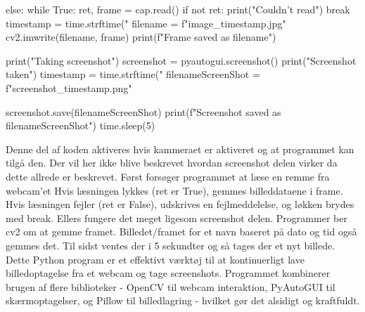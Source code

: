 \begin{python}
    else:
        while True:
            ret, frame = cap.read()
            if not ret:
                print("Couldn't read")
                break
            timestamp = time.strftime("%
            filename = f"image_{timestamp}.jpg"
            cv2.imwrite(filename, frame)
            print(f"Frame saved as {filename}")

            print("Taking screenshot")
            screenshot = pyautogui.screenshot()
            print("Screenshot taken")
            timestamp = time.strftime("%
            filenameScreenShot = f"screenshot_{timestamp}.png"

            screenshot.save(filenameScreenShot)
            print(f"Screenshot saved as {filenameScreenShot}")
            time.sleep(5)
\end{python}
Denne del af koden aktiveres hvis kammeraet er aktiveret og at programmet kan tilgå den. Der vil her ikke blive beskrevet hvordan screenshot delen virker da dette allrede er beskrevet. Først forsøger programmet at læse en remme fra webcam'et  Hvis læsningen lykkes (ret er True), gemmes billeddataene i frame. Hvis læsningen fejler (ret er False), udskrives en fejlmeddelelse, og løkken brydes med break. Ellers fungere det meget ligesom screenshot delen. Programmer ber cv2 om at gemme framet. Billedet/framet for et navn baseret på dato og tid også gemmes det. Til sidst ventes der i 5 sekundter og så tages der et nyt billede. Dette Python program er et effektivt værktøj til at kontinuerligt lave billedoptagelse fra et webcam og tage screenshots. Programmet kombinerer brugen af flere biblioteker - OpenCV til webcam interaktion, PyAutoGUI til skærmoptagelser, og Pillow til billedlagring - hvilket gør det alsidigt og kraftfuldt.

